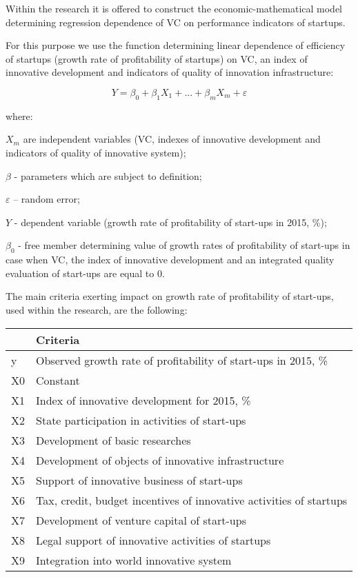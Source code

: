 Within the research it is offered to construct the economic-mathematical model determining regression dependence of VC on performance indicators of startups.

For this purpose we use the function determining linear dependence of efficiency of startups (growth rate of profitability of startups) on VC, an index of innovative development and indicators of quality of innovation infrastructure:

\begin{equation} \label{eq:OLS}
Y = \beta_0 + \beta_{1}X_{1}+...+\beta_{m}X_{m} + \varepsilon
\end{equation}

where:

$X_m$ are independent variables (VC, indexes of innovative development and indicators of quality of innovative system);

$\beta$ - parameters which are subject to definition; 

$\varepsilon$ – random error;

$Y$ - dependent variable (growth rate of profitability of start-ups in 2015, \%);

$\beta_0$ - free member determining value of growth rates of profitability of start-ups in case when VC, the index of innovative development and an integrated quality evaluation of start-ups are equal to 0.

The main criteria exerting impact on growth rate of profitability of start-ups, used within the research, are the following:

\begin{tabular}{ll}
    \toprule
    {} &                                           Criteria \\
    \midrule
    y  &  Observed growth rate of profitability of start-ups in 2015, \% \\
    X0 &  Constant\\
    X1 &        Index of innovative development for 2015, \% \\
    X2 &     State participation in activities of start-ups \\
    X3 &                    Development of basic researches \\
    X4 &  Development of objects of innovative infrastructure \\
    X5 &        Support of innovative business of start-ups \\
    X6 &  Tax, credit, budget incentives of innovative activities of startups \\
    X7 &        Development of venture capital of start-ups \\
    X8 &  Legal support of innovative activities of startups \\
    X9 &           Integration into world innovative system \\
    \bottomrule
\end{tabular}


